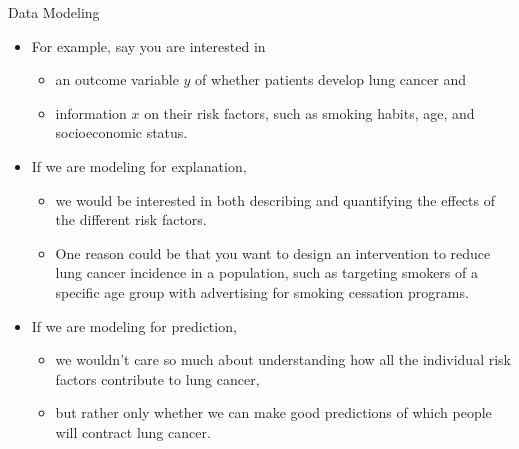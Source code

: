 \documentclass[
  ignorenonframetext,
]{beamer}
\providecommand{\tightlist}{%
  \setlength{\itemsep}{0pt}\setlength{\parskip}{0pt}}
\begin{document}
\begin{frame}{Data Modeling}
\protect{}\label{data-modeling-1}
\begin{itemize}
\item
  For example, say you are interested in

  \begin{itemize}
  \tightlist
  \item
    an outcome variable \(y\) of whether patients develop lung cancer
    and
  \item
    information \(x\) on their risk factors, such as smoking habits,
    age, and socioeconomic status.
  \end{itemize}
\item
  If we are modeling for explanation,

  \begin{itemize}
  \tightlist
  \item
    we would be interested in both describing and quantifying the
    effects of the different risk factors.
  \item
    One reason could be that you want to design an intervention to
    reduce lung cancer incidence in a population, such as targeting
    smokers of a specific age group with advertising for smoking
    cessation programs.
  \end{itemize}
\item
  If we are modeling for prediction,

  \begin{itemize}
  \tightlist
  \item
    we wouldn't care so much about understanding how all the individual
    risk factors contribute to lung cancer,
  \item
    but rather only whether we can make good predictions of which people
    will contract lung cancer.
  \end{itemize}
\end{itemize}
\end{frame}
\end{document}
